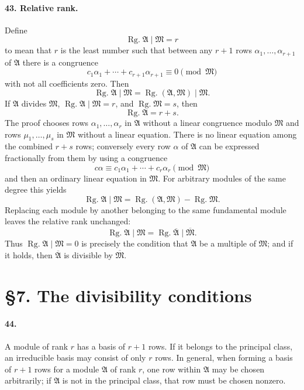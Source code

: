 \documentclass[11pt]{article}
\newcommand{\Rg}{\operatorname{Rg.}}
\begin{document}
\paragraph{43. Relative rank.}
Define
\[
\Rg\mathfrak A\mid\mathfrak M=r
\]
to mean that $r$ is the least number such that between any $r+1$ rows $\alpha_1,
\ldots,
\alpha_{r+1}$ of $\mathfrak A$ there is a congruence
\begin{equation}
 c_1\alpha_1+
\cdots+c_{r+1}\alpha_{r+1}\equiv0\pmod{\mathfrak M}
\tag{60}
\end{equation}
with not all coefficients zero. Then
\begin{equation}
\Rg\mathfrak A\mid\mathfrak M=
\Rg(\mathfrak A,
\mathfrak M)\mid\mathfrak M.
\tag{62}
\end{equation}
If $\mathfrak A$ divides $\mathfrak M$, $\Rg\mathfrak A\mid\mathfrak M=r$, and $\Rg\mathfrak M=s$, then
\[
\Rg\mathfrak A=r+s.
\]
The proof chooses rows $\alpha_1,
\ldots,
\alpha_r$ in $\mathfrak A$ without a linear congruence modulo $\mathfrak M$ and rows $\mu_1,
\ldots,
\mu_s$ in $\mathfrak M$ without a linear equation. There is no linear equation among the combined $r+s$ rows; conversely every row $\alpha$ of $\mathfrak A$ can be expressed fractionally from them by using a congruence
\begin{equation}
 c\alpha\equiv c_1\alpha_1+
\cdots+c_r\alpha_r\pmod{\mathfrak M}
\tag{65}
\end{equation}
and then an ordinary linear equation in $\mathfrak M$. For arbitrary modules of the same degree this yields
\begin{equation}
\Rg\mathfrak A\mid\mathfrak M=
\Rg(\mathfrak A,
\mathfrak M)-\Rg\mathfrak M.
\tag{69}
\end{equation}
Replacing each module by another belonging to the same fundamental module leaves the relative rank unchanged:
\begin{equation}
\Rg\mathfrak A\mid\mathfrak M=
\Rg\overline{\mathfrak A}\mid\overline{\mathfrak M}.
\tag{70}
\end{equation}
Thus $\Rg\mathfrak A\mid\mathfrak M=0$ is precisely the condition that $\mathfrak A$ be a multiple of $\mathfrak M$; and if it holds, then $\overline{\mathfrak A}$ is divisible by $\overline{\mathfrak M}$.

\section*{\S 7. The divisibility conditions}

\paragraph{44.}
A module of rank $r$ has a basis of $r+1$ rows. If it belongs to the principal class, an irreducible basis may consist of only $r$ rows. In general, when forming a basis of $r+1$ rows for a module $\mathfrak A$ of rank $r$, one row within $\mathfrak A$ may be chosen arbitrarily; if $\mathfrak A$ is not in the principal class, that row must be chosen nonzero.
\end{document}
